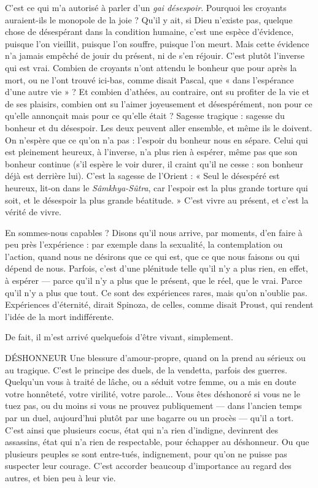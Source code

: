 C’est ce qui m’a autorisé à parler d’un {\it gai désespoir}. Pourquoi les croyants
auraient-ils le monopole de la joie ? Qu'il y ait, si Dieu n’existe pas, quelque
chose de désespérant dans la condition humaine, c’est une espèce d’évidence,
puisque l’on vieillit, puisque l’on souffre, puisque l’on meurt. Mais cette évidence
n’a jamais empêché de jouir du présent, ni de s’en réjouir. C’est plutôt
l'inverse qui est vrai. Combien de croyants n’ont attendu le bonheur que pour
après la mort, ou ne l’ont trouvé ici-bas, comme disait Pascal, que « dans l’espérance
d’une autre vie » ? Et combien d’athées, au contraire, ont su profiter de
la vie et de ses plaisirs, combien ont su l’aimer joyeusement et désespérément,
non pour ce qu’elle annonçait mais pour ce qu’elle était ? Sagesse tragique :
sagesse du bonheur et du désespoir. Les deux peuvent aller ensemble, et même
ils le doivent. On n’espère que ce qu’on n’a pas : l'espoir du bonheur nous en
sépare. Celui qui est pleinement heureux, à l’inverse, n’a plus rien à espérer,
même pas que son bonheur continue (s’il espère le voir durer, il craint qu’il ne
cesse : son bonheur déjà est derrière lui). C’est la sagesse de l'Orient : « Seul le
désespéré est heureux, lit-on dans le {\it Sâmkhya-Sûtra}, car l'espoir est la plus
grande torture qui soit, et le désespoir la plus grande béatitude. » C’est vivre au
présent, et c’est la vérité de vivre.

En sommes-nous capables ? Disons qu’il nous arrive, par moments, d’en
faire à peu près l’expérience : par exemple dans la sexualité, la contemplation
ou l’action, quand nous ne désirons que ce qui est, que ce que nous faisons ou
qui dépend de nous. Parfois, c’est d’une plénitude telle qu’il n’y a plus rien, en
effet, à espérer — parce qu’il n’y a plus que le présent, que le réel, que le vrai.
Parce qu’il n’y a plus que tout. Ce sont des expériences rares, mais qu’on
n'oublie pas. Expériences d’éternité, dirait Spinoza, de celles, comme disait
Proust, qui rendent l’idée de la mort indifférente.

De fait, il m'est arrivé quelquefois d’être vivant, simplement.

DÉSHONNEUR Une blessure d’amour-propre, quand on la prend au sérieux
ou au tragique. C’est le principe des duels, de la vendetta,
parfois des guerres. Quelqu'un vous à traité de lâche, ou a séduit votre femme,
ou a mis en doute votre honnêteté, votre virilité, votre parole... Vous êtes
déshonoré si vous ne le tuez pas, ou du moins si vous ne prouvez publiquement
— dans l’ancien temps par un duel, aujourd’hui plutôt par une bagarre ou un
procès — qu’il a tort. C’est ainsi que plusieurs cocus, état qui n’a rien d’indigne,
devinrent des assassins, état qui n’a rien de respectable, pour échapper au
déshonneur. Ou que plusieurs peuples se sont entre-tués, indignement, pour
qu'on ne puisse pas suspecter leur courage. C’est accorder beaucoup d’importance
au regard des autres, et bien peu à leur vie.

